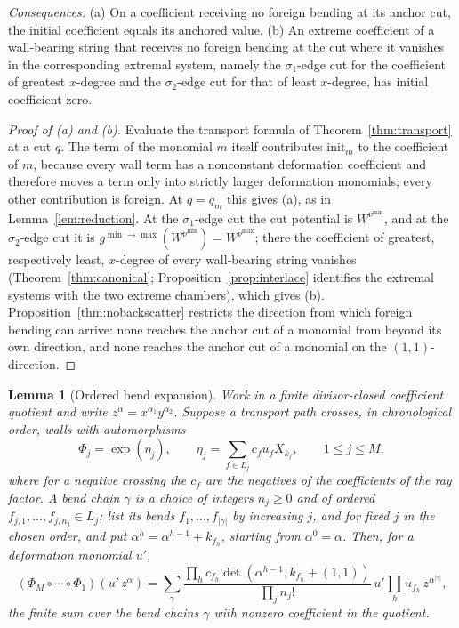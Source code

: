 \documentclass[11pt]{amsart}
\newtheorem{lemma}[theorem]{Lemma}
\theoremstyle{definition}
\theoremstyle{remark}
\begin{document}
\emph{Consequences.}  (a) On a coefficient receiving no foreign bending at its
anchor cut, the initial coefficient equals its anchored value.  (b) An extreme
coefficient of a wall-bearing string that receives no foreign bending at the
cut where it vanishes in the corresponding extremal system, namely the
$\sigma_1$-edge cut for the coefficient of greatest $x$-degree and the
$\sigma_2$-edge cut for that of least $x$-degree, has initial coefficient
zero.

\begin{proof}[Proof of (a) and (b)]
Evaluate the transport formula of Theorem~\ref{thm:transport} at a cut $q$.
The term of the monomial $m$ itself contributes $\mathrm{init}_m$ to the
coefficient of $m$, because every wall term has a nonconstant deformation
coefficient and therefore moves a term only into strictly larger deformation
monomials; every other contribution is foreign.  At $q=q_m$ this gives (a), as
in Lemma~\ref{lem:reduction}.  At the $\sigma_1$-edge cut the cut potential is
$W^{\nu^{\min}}$, and at the $\sigma_2$-edge cut it is
$g^{\min\to\max}(W^{\nu^{\min}})=W^{\nu^{\max}}$; there the coefficient of
greatest, respectively least, $x$-degree of every wall-bearing string
vanishes (Theorem~\ref{thm:canonical}; Proposition~\ref{prop:interlace}
identifies the extremal systems with the two extreme chambers), which gives
(b).  Proposition~\ref{thm:nobackscatter} restricts the direction from which foreign
bending can arrive: none reaches the anchor cut of a monomial from beyond its
own direction, and none reaches the anchor cut of a monomial on the
$(1,1)$-direction.
\end{proof}

\begin{lemma}[Ordered bend expansion]
\label{lem:bendchain}
Work in a finite divisor-closed coefficient quotient and write
$z^\alpha=x^{\alpha_1}y^{\alpha_2}$.  Suppose a transport path crosses, in
chronological order, walls with automorphisms
\[
 \Phi_j=\exp(\eta_j),\qquad
 \eta_j=\sum_{f\in L_j}c_f u_f X_{k_f},\qquad 1\le j\le M,
\]
where for a negative crossing the $c_f$ are the negatives of the
coefficients of the ray factor.  A \emph{bend chain} $\gamma$ is a choice of
integers $n_j\ge0$ and of ordered $f_{j,1},\ldots,f_{j,n_j}\in L_j$; list
its bends $f_1,\dots,f_{|\gamma|}$ by increasing $j$, and for fixed $j$ in
the chosen order, and put $\alpha^h=\alpha^{h-1}+k_{f_h}$, starting from
$\alpha^0=\alpha$.  Then, for a deformation monomial $u'$,
\begin{equation}
\label{eq:bendchain}
 (\Phi_M\circ\cdots\circ\Phi_1)(u'\,z^\alpha)
 =\sum_\gamma
 \frac{\prod_h c_{f_h}
  \det(\alpha^{h-1},k_{f_h}+(1,1))}
 {\prod_j n_j!}\,
 u'\prod_hu_{f_h}\,z^{\alpha^{|\gamma|}},
\end{equation}
the finite sum over the bend chains $\gamma$ with nonzero coefficient in the
quotient.
\end{lemma}
\end{document}
